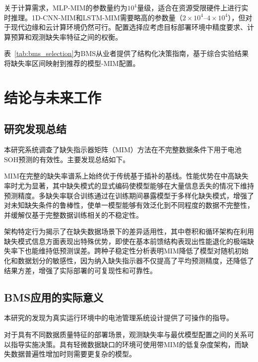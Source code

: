 \documentclass[10pt,a4paper]{ctexart}
\begin{document}
关于计算需求，MLP-MIM的参数量约为$10^4$量级，适合在资源受限硬件上进行实时推理。1D-CNN-MIM和LSTM-MIM需要略高的参数量（$2\times10^4$--$4\times10^4$），但对于现代边缘和云计算环境仍然可行。配置选择应考虑目标部署环境中精度要求、计算预算和观测缺失率特征之间的权衡。

表~\ref{tab:bms_selection}为BMS从业者提供了结构化决策指南，基于综合实验结果将缺失率区间映射到推荐的模型-MIM配置。

\section{结论与未来工作}\label{sec:conclusion}

\subsection{研究发现总结}\label{sec:findings}

本研究系统调查了缺失指示器矩阵（MIM）方法在不完整数据条件下用于电池SOH预测的有效性。主要发现总结如下。

MIM在完整的缺失率谱系上始终优于传统基于插补的基线。性能优势在中高缺失率时尤为显著，其中缺失模式的显式编码使模型能够在大量信息丢失的情况下维持预测精度。多缺失率联合训练通过在训练期间暴露模型于多样化缺失模式，增强了对未知缺失条件的鲁棒性，使单一模型能够有效泛化到不同程度的数据不完整性，并缓解仅基于完整数据训练相关的不稳定性。

架构特定行为揭示了在缺失数据场景下的差异适用性，其中卷积和循环架构在利用缺失模式信息方面表现出特殊优势，即使在基本前馈结构表现出性能退化的极端缺失率下也能维持低预测误差。跨种子稳定性分析表明MIM降低了模型对随机初始化和数据划分的敏感性，因为纳入缺失指示器不仅提高了平均预测精度，还降低了结果方差，增强了实际部署的可复现性和可靠性。

\subsection{BMS应用的实际意义}\label{sec:implications}

本研究的发现为真实运行环境中的电池管理系统设计提供了可操作的指导。

对于具有不同数据质量特征的部署场景，观测缺失率与最优模型配置之间的关系可以指导实施决策。具有轻微数据缺口的环境可使用带MIM的低复杂度架构，而缺失数据普遍性增加时则需要更复杂的模型。
\end{document}
